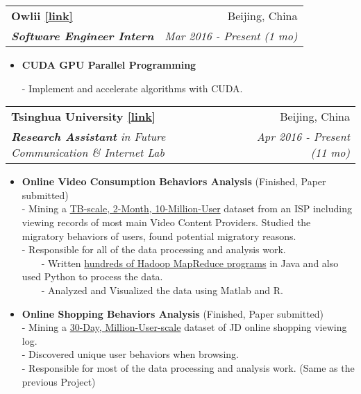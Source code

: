 \documentclass[letterpaper,11pt]{article}
\makeatletter
\newcommand{\resumeItem}[2]{
  \item\small{
    \textbf{#1}{ #2 \vspace{-2pt}}
  }
}
\newcommand{\resumeSubheading}[4]{
  \vspace{-1pt}\item
    \begin{tabular*}{0.97\textwidth}{l@{\extracolsep{\fill}}r}
      \textbf{#1} & #2 \\
      \textit{\small#3} & \textit{\small #4} \\
    \end{tabular*}\vspace{-5pt}
}
\newcommand{\resumeItemListStart}{\begin{itemize}}
\newcommand{\resumeItemListEnd}{\end{itemize}\vspace{-5pt}}
\makeatother
\begin{document}
    \resumeSubheading
      {Owlii \color{blue}\href{http://www.owlii.com}{[link]}}{Beijing, China}
      {\textbf{Software Engineer Intern}}{Mar 2016 - Present (1 mo)}
      \resumeItemListStart

        \resumeItem{CUDA GPU Parallel Programming}\\
        \vspace{1mm}
          {- Implement and accelerate algorithms with CUDA.}\\
      \resumeItemListEnd
  
  
    \resumeSubheading
      {Tsinghua University \color{blue}\href{http://fi.ee.tsinghua.edu.cn}{[link]}}{Beijing, China}
      {\textbf{Research Assistant} in Future Communication \& Internet Lab}{Apr 2016 - Present (11 mo)}
      \resumeItemListStart

        \resumeItem{Online Video Consumption Behaviors Analysis}{(Finished, Paper submitted)}\\
        \vspace{1mm}
          {- Mining a \underline{TB-scale, 2-Month, 10-Million-User} dataset from an ISP including viewing records of most main Video Content Providers. Studied the migratory behaviors of users, found potential migratory reasons.}\\
          {- Responsible for all of the data processing and analysis work.} \\
          {~~~~- Written \underline{hundreds of Hadoop MapReduce programs} in Java and also used Python to process the data.}\\
          {~~~~- Analyzed and Visualized the data using Matlab and R.}\\

        \resumeItem{Online Shopping Behaviors Analysis}{(Finished, Paper submitted)}\\
        \vspace{1mm}
          {- Mining a \underline{30-Day, Million-User-scale} dataset of JD online shopping viewing log.}\\
          {- Discovered unique user behaviors when browsing.} \\
          {- Responsible for most of the data processing and analysis work. (Same as the previous Project)}\\
          
      \resumeItemListEnd
  
\end{document}
